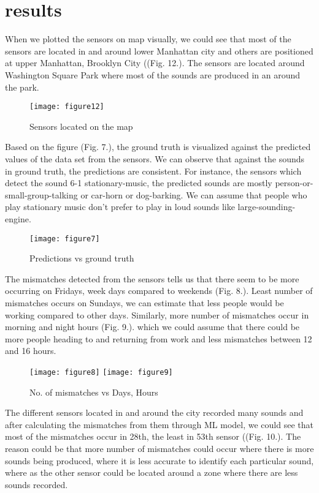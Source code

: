 	\section{results}
	When we plotted the sensors on map visually, we could see that most of the sensors are located in and around lower Manhattan city and others are positioned at upper Manhattan, Brooklyn City ((Fig. 12.). The sensors are located around Washington Square Park where most of the sounds are produced in an around the park. 

	\begin{figure}[h!]
		\centering
		\texttt{[image: figure12]}
		\caption{Sensors located on the map}
	\end{figure}

	Based on the figure (Fig. 7.), the ground truth is visualized against the predicted values of the data set from the sensors. We can observe that against the sounds in ground truth, the predictions are consistent. For instance, the sensors which detect the sound 6-1 stationary-music, the predicted sounds are mostly person-or-small-group-talking or car-horn or dog-barking. We can assume that people who play stationary music don't prefer to play in loud sounds like large-sounding-engine.  

	\begin{figure}[h!]
		\texttt{[image: figure7]}
		\caption{Predictions vs ground truth}
	\end{figure}

	The mismatches detected from the sensors tells us that there seem to be more occurring on Fridays, week days compared to weekends (Fig. 8.). Least number of mismatches occurs on Sundays, we can estimate that less people would be working compared to other days.
	Similarly, more number of mismatches occur in morning and night hours (Fig. 9.). which we could assume that there could be more people heading to and returning from work and less mismatches between 12 and 16 hours.


	\begin{figure}[h!]
		\centering
		\texttt{[image: figure8]}
		\texttt{[image: figure9]}
		\caption{No. of mismatches vs Days, Hours}
	\end{figure}

	The different sensors located in and around the city recorded many sounds and after calculating the mismatches from them through ML model, we could see that most of the mismatches occur in 28th, the least in 53th sensor ((Fig. 10.). The reason could be that more number of mismatches could occur where there is more sounds being produced, where it is less accurate to identify each particular sound, where as the other sensor could be located around a zone where there are less sounds recorded.

